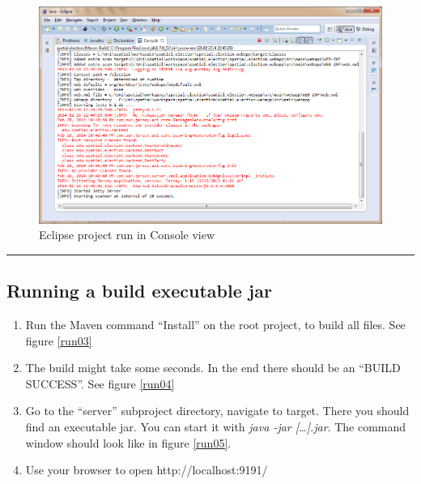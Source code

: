 \begin{figure}[htbp]
\centering
  \includegraphics[width=1.1\textwidth]{../img/UZXVJIp.png}
\caption{Eclipse project run in Console view}
\label{run02}
\end{figure}

\begin{center}\rule{3in}{0.4pt}\end{center}

\subsection{Running a build executable
jar}\label{running-a-build-executable-jar}

\begin{enumerate}
\def\labelenumi{\arabic{enumi}.}
\itemsep1pt\parskip0pt
\item
  Run the Maven command ``Install'' on the root project, to build all
  files. See figure \ref{run03}
  
\item
  The build might take some seconds. In the end there should be an
  ``BUILD SUCCESS''. See figure \ref{run04}
  
  
\item
  Go to the ``server'' subproject directory, navigate to target. There
  you should find an executable jar. You can start it with \emph{java
  -jar {[}\ldots{}{]}.jar}. The command window should look like in figure
  \ref{run05}.
  
  
  
\item
  Use your browser to open http://localhost:9191/
\end{enumerate}

